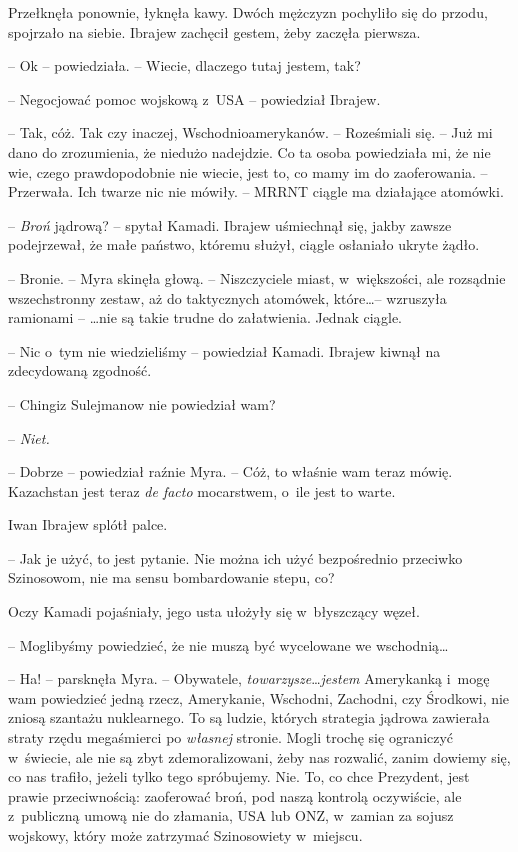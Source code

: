 \documentclass[oneside,polish,11pt,sfheadings]{mwbk}
\begin{document}
Przełknęła ponownie, łyknęła kawy. Dwóch mężczyzn pochyliło się do
przodu, spojrzało na siebie. Ibrajew zachęcił gestem, żeby zaczęła
pierwsza.

-- Ok -- powiedziała. -- Wiecie, dlaczego tutaj jestem, tak?

-- Negocjować pomoc wojskową z~USA -- powiedział Ibrajew.

-- Tak, cóż. Tak czy inaczej, Wschodnioamerykanów. -- Roześmiali się. -- Już mi dano do zrozumienia, że niedużo nadejdzie. Co ta osoba
powiedziała mi, że nie wie, czego prawdopodobnie nie wiecie, jest to, co
mamy im do zaoferowania. -- Przerwała. Ich twarze nic nie mówiły. -- MRRNT
ciągle ma działające atomówki.

-- \textit{Broń} jądrową? -- spytał Kamadi. Ibrajew uśmiechnął się, jakby
zawsze podejrzewał, że małe państwo, któremu służył, ciągle osłaniało
ukryte żądło.

-- Bronie. -- Myra skinęła głową. -- Niszczyciele miast, w~większości, ale
rozsądnie wszechstronny zestaw, aż do taktycznych atomówek, które\ldots -- wzruszyła ramionami -- \ldots nie są takie trudne do załatwienia. Jednak
ciągle.

-- Nic o~tym nie wiedzieliśmy -- powiedział Kamadi. Ibrajew kiwnął na
zdecydowaną zgodność.

-- Chingiz Sulejmanow nie powiedział wam?

-- \textit{Niet.}

-- Dobrze -- powiedział raźnie Myra. -- Cóż, to właśnie wam teraz mówię.
Kazachstan jest teraz \textit{de facto} mocarstwem, o~ile jest to warte.

Iwan Ibrajew splótł palce. 

-- Jak je użyć, to jest pytanie. Nie można ich
użyć bezpośrednio przeciwko Szinosowom, nie ma sensu bombardowanie
stepu, co?

Oczy Kamadi pojaśniały, jego usta ułożyły się w~błyszczący węzeł. 

-- Moglibyśmy powiedzieć, że nie muszą być wycelowane we wschodnią\ldots

-- Ha! -- parsknęła Myra. -- Obywatele, \textit{towarzysze}\ldots \textit{jestem}
Amerykanką i~mogę wam powiedzieć jedną rzecz, Amerykanie, Wschodni,
Zachodni, czy Środkowi, nie zniosą szantażu nuklearnego. To są ludzie,
których strategia jądrowa zawierała straty rzędu megaśmierci po
\textit{własnej} stronie. Mogli trochę się ograniczyć w~świecie, ale nie
są zbyt zdemoralizowani, żeby nas rozwalić, zanim dowiemy się, co nas
trafiło, jeżeli tylko tego spróbujemy. Nie. To, co chce Prezydent, jest
prawie przeciwnością: zaoferować broń, pod naszą kontrolą oczywiście,
ale z~publiczną umową nie do złamania, USA lub ONZ, w~zamian za sojusz
wojskowy, który może zatrzymać Szinosowiety w~miejscu.
\end{document}
